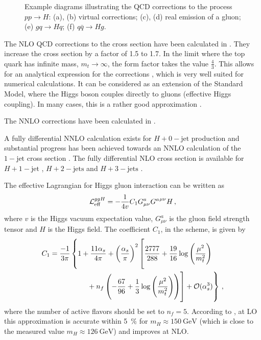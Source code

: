\begin{figure}
\begin{subfigure}[]{0.3\textwidth}
	\caption{}
\end{subfigure}
\caption{Example diagrams illustrating the QCD corrections to the process $pp \rightarrow H$:
		(a), (b) virtual corrections; (c), (d) real emission of a gluon; (e) $gq \rightarrow Hq$; (f) $q \bar q \rightarrow Hg$.}
\label{fig:ggh_corrections}
\end{figure}
%

The NLO QCD corrections to the cross section have been calculated in \cite{gfusionnlo1}.
They increase the cross section by a factor of \num{1.5} to \num{1.7}.
In the limit where the top quark has infinite mass, $m_t \rightarrow \infty$, the form factor takes the value $\frac{4}{3}$.
This allows for an analytical expression for the corrections \cite{gfusionnlo2}, which is very well suited for numerical calculations.
It can be considered as an extension of the Standard Model, where the Higgs boson couples directly to gluons (effective Higgs coupling).
In many cases, this is a rather good approximation \cite{symmetrybreaking1}.

The NNLO corrections have been calculated in \cite{gfusionnnlo1, gfusionnnlo2}.


A fully differential NNLO calculation exists for $H + 0-\text{jet}$ production \cite{ggh_nnlo_fullydiff_1,ggh_nnlo_fullydiff_2} and substantial progress has been achieved towards an NNLO calculation of the $1-\text{jet}$ cross section \cite{gghj_nnlo_progress}.
The fully differential NLO cross section is available for $H + 1-\text{jet}$ \cite{gghj_nlo_fullydiff_1,gghj_nlo_fullydiff_2}, $H + 2-\text{jets}$ \cite{gghjj_nlo_fullydiff_1,gghjj_nlo_fullydiff_2} and $H + 3-\text{jets}$ \cite{gghjjj_nlo_fullydiff}.


The effective Lagrangian for Higgs gluon interaction can be written as \cite{gfusionnnlo2}
%
\begin{equation}
	\operatorname{\mathcal{L}}_\text{eff}^{ggH} = - \frac{1}{4v} C_1 G_{\mu \nu}^a {G^a}^{\mu \nu} H \, ,
\end{equation}
%
where $v$ is the Higgs vacuum expectation value, $G^a_{\mu \nu}$ is the gluon field strength tensor and $H$ is the Higgs field.
The coefficient $C_1$, in the \msbar{} scheme, is given by
%
\begin{align}
	C_1 = \frac{-1}{3 \pi} &\left\{1 + \frac{11 \alpha_s}{4 \pi} + \left( \frac{\alpha_s}{\pi} \right)^2 \left[ \frac{2777}{288} + \frac{19}{16} \log\left( \frac{\mu^2}{m_t^2} \right)
	\vphantom{n_f \left( -\frac{67}{96} + \frac{1}{3} \log\left( \frac{\mu^2}{m_t^2} \right) \right)} \right. \right. \nonumber \\
		&\qquad \left. \left. \vphantom{\frac{2777}{288} + \frac{19}{16} \log\left( \frac{\mu^2}{m_t^2} \right)}
		+ n_f \left( -\frac{67}{96} + \frac{1}{3} \log\left( \frac{\mu^2}{m_t^2} \right) \right) \right] + \order{\alpha_s^3} \right\} \, ,
\end{align}
%
where the number of active flavors should be set to $n_f = 5$.
According to \cite{gfusionnnlo2}, at LO this approximation is accurate within \SI{5}{\percent} for $m_H \approx \SI{150}{\giga\electronvolt}$ (which is close to the measured value $m_H \approx \SI{126}{\giga\electronvolt}$) and improves at NLO.

